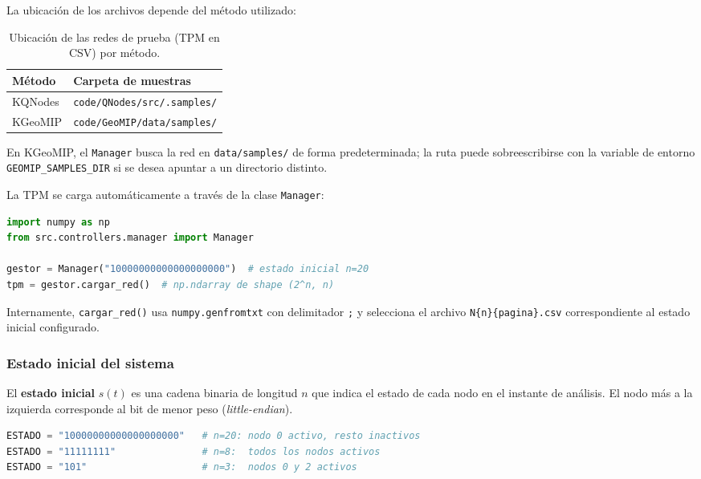 La ubicación de los archivos depende del método utilizado:

\begin{table}[h!]
\centering
\begin{tabular}{|l|l|}
\hline
\textbf{Método} & \textbf{Carpeta de muestras} \\
\hline
KQNodes  & \texttt{code/QNodes/src/.samples/} \\
KGeoMIP  & \texttt{code/GeoMIP/data/samples/} \\
\hline
\end{tabular}
\caption{Ubicación de las redes de prueba (TPM en CSV) por método.}
\label{tab:rutas_samples}
\end{table}

En KGeoMIP, el \texttt{Manager} busca la red en \texttt{data/samples/} de forma
predeterminada; la ruta puede sobreescribirse con la variable de entorno
\texttt{GEOMIP\_SAMPLES\_DIR} si se desea apuntar a un directorio distinto.

La TPM se carga automáticamente a través de la clase \texttt{Manager}:

\begin{lstlisting}[language=Python]
import numpy as np
from src.controllers.manager import Manager

gestor = Manager("10000000000000000000")  # estado inicial n=20
tpm = gestor.cargar_red()  # np.ndarray de shape (2^n, n)
\end{lstlisting}

Internamente, \texttt{cargar\_red()} usa \texttt{numpy.genfromtxt} con delimitador
\texttt{;} y selecciona el archivo \texttt{N\{n\}\{pagina\}.csv} correspondiente al
estado inicial configurado.

\subsubsection{Estado inicial del sistema}

El \textbf{estado inicial} $s(t)$ es una cadena binaria de longitud $n$ que indica
el estado de cada nodo en el instante de análisis. El nodo más a la izquierda
corresponde al bit de menor peso (\textit{little-endian}).

\begin{lstlisting}[language=Python]
ESTADO = "10000000000000000000"   # n=20: nodo 0 activo, resto inactivos
ESTADO = "11111111"               # n=8:  todos los nodos activos
ESTADO = "101"                    # n=3:  nodos 0 y 2 activos
\end{lstlisting}

